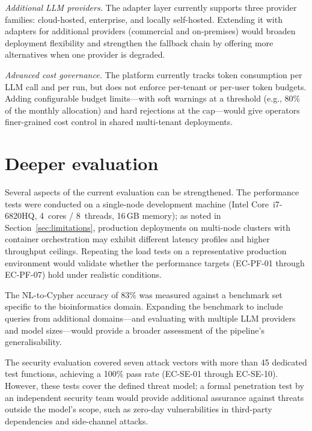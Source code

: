 \documentclass[a4paper]{sapthesis}
\begin{document}
\emph{Additional LLM providers.}  The adapter layer currently supports
three provider families: cloud-hosted, enterprise, and locally
self-hosted.  Extending it with adapters for additional providers
(commercial and on-premises) would broaden deployment flexibility and
strengthen the fallback chain by offering more alternatives when one
provider is degraded.

\emph{Advanced cost governance.}  The platform currently tracks token
consumption per LLM call and per run, but does not enforce per-tenant
or per-user token budgets.  Adding configurable budget limits---with
soft warnings at a threshold (e.g., 80\% of the monthly allocation) and
hard rejections at the cap---would give operators finer-grained cost
control in shared multi-tenant deployments.

\section{Deeper evaluation}
\label{sec:fw-eval}

Several aspects of the current evaluation can be strengthened.  The
performance tests were conducted on a single-node development machine
(Intel Core~i7-6820HQ, 4~cores / 8~threads, 16\,GB memory); as noted in
Section~\ref{sec:limitations}, production deployments on multi-node
clusters with container orchestration may exhibit different latency
profiles and higher throughput ceilings.  Repeating the load tests on a
representative production environment would validate whether the
performance targets (EC-PF-01 through EC-PF-07) hold under realistic
conditions.

The NL-to-Cypher accuracy of 83\% was measured against a benchmark set
specific to the bioinformatics domain.  Expanding the benchmark to include
queries from additional domains---and evaluating with multiple LLM
providers and model sizes---would provide a broader assessment of the
pipeline's generalisability.

The security evaluation covered seven attack vectors with more than 45
dedicated test functions, achieving a 100\% pass rate (EC-SE-01 through
EC-SE-10).  However, these tests cover the defined threat model; a formal
penetration test by an independent security team would provide additional
assurance against threats outside the model's scope, such as zero-day
vulnerabilities in third-party dependencies and side-channel attacks.
\end{document}
